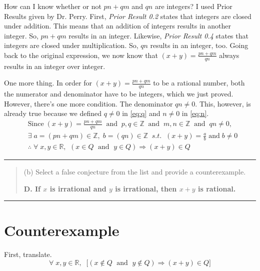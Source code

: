 How can I know whether or not
$p n + q m$ and $q n$ are integers?
I used Prior Results given by Dr. Perry.
First,
\textit{Prior Result 0.2} states that
integers are closed under addition.
This means that an addition of integers
results in another integer. So, $p n + q m$
results in an integer. Likewise,
\textit{Prior Result 0.4} states that
integers are closed under multiplication.
So, $q n$ results in an integer, too.
Going back to the original expression,
we now know that
$(x + y) = \frac{p n + q m}{q n}$
always results in an integer over integer.

One more thing. In order for
$(x + y) = \frac{p n + q m}{q n}$
to be a rational number,
both the numerator and denominator
have to be integers, which we just
proved. However, there's one more condition.
The denominator $q n \neq 0$.
This, however, is already true because
we defined $q \neq 0$ in \eqref{eq:q} and
$n \neq 0$ in \eqref{eq:n}.
\begin{align}
	&\text{Since} \; (x + y) = \frac{p n + q m}{q n}
	\;\; \text{and} \;\; 
	p,q \in \mathbb{Z}
	\;\; \text{and} \;\;
	m,n \in \mathbb{Z}
	\;\; \text{and} \;\;
	q n \neq 0,
	\\
	&\exists \; a = (p n + q m)
	\in \mathbb{Z}, \;
	b = (q n)
	\in \mathbb{Z}
	\;\; s.t. \;\; (x + y) = \frac{a}{b} 
	\; \text{and} \; b \neq 0
	\\
	&\therefore \;
	\forall \;
	x,y \in \mathbb{R} \text{,} \; \;
	( x \in Q \; \text{ and } \; y \in Q )
	\Rightarrow
	(x+y) \in Q	
\end{align}

\newpage

\bgroup
\color{abs}
\hrule
\egroup

\begin{abstract}
(b) Select a false conjecture from the list and
provide a counterexample.

\: \; \textbf{
D. If $x$ is irrational and $y$ is irrational,
then $x + y$ is rational.
}
\noindent\textbf{\\}
\end{abstract}

\bgroup
\color{abs}
\hrule
\egroup

\section*{Counterexample}

First, translate.
\begin{equation}
	\forall \;
	x,y \in \mathbb{R}, \; \;
	\big[ (x \notin Q \; \text{ and } \; y \notin Q)
	\Rightarrow
	(x+y) \in Q \big]
\end{equation}

